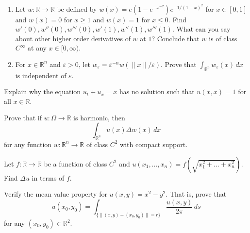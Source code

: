\documentclass[12 pt, letterpaper]{hmcpset}
\begin{document}
\begin{problem}[1.]
	\begin{enumerate}
		\item Let $w : \mathbb{R} \to \mathbb{R}$ be defined by $w(x) = e(1 - e^{-x^{-2}}) e^{-1 / (1 - x)^{2}}$ for $x \in [0, 1]$ and $w(x) = 0$ for $x \ge 1$ and  $w(x) = 1$ for $x \le 0$. Find $w'(0), w''(0), w'''(0), w'(1), w''(1), w'''(1)$. What can you say about other higher order derivatives of $w$ at $1$? Conclude that $w$ is of class $C^{\infty}$ at any $x \in [0, \infty)$.

		\item For $x \in \mathbb{R}^{n}$ and $\varepsilon > 0$, let $w_{\varepsilon} = \varepsilon^{-n} w(\lVert x \rVert / \varepsilon)$. Prove that $\int_{\mathbb{R}^{n}} w_{\varepsilon}(x) \, dx$ is independent of $\varepsilon$.
	\end{enumerate}
\end{problem}

\begin{problem}[2.]
	Explain why the equation $u_{t} + u_{x} = x$ has no solution such that $u(x, x) = 1$ for all $x \in \mathbb{R}$.
\end{problem}

\begin{problem}[3.]
	Prove that if $u : \Omega \to \mathbb{R}$ is harmonic, then
	\[
		\int_{\mathbb{R}^{n}} u(x) \Delta w(x) \, dx 
	\]
	for any function $w : \mathbb{R}^{n} \to \mathbb{R}$ of class $C^{2}$ with compact support.
\end{problem}

\begin{problem}[4.]
	Let $f : \mathbb{R} \to \mathbb{R}$ be a function of class $C^{2}$ and $u(x_{1}, \dots, x_{n}) = f(\sqrt{x_{1}^{2} + \dots + x_{n}^{2}})$. Find $\Delta u$ in terms of $f$.
\end{problem}

\begin{problem}[5.]
	Verify the mean value property for $u(x, y) = x^{2} - y^{2}$. That is, prove that
	\[
		u(x_{0}, y_{0}) = \int_{\{ \lVert (x, y) - (x_{0}, y_{0}) \rVert = r \}} \frac{u(x, y)}{2 \pi} \, ds
	\]
	for any $(x_{0}, y_{0}) \in \mathbb{R}^{2}$.
\end{problem}
\end{document}
